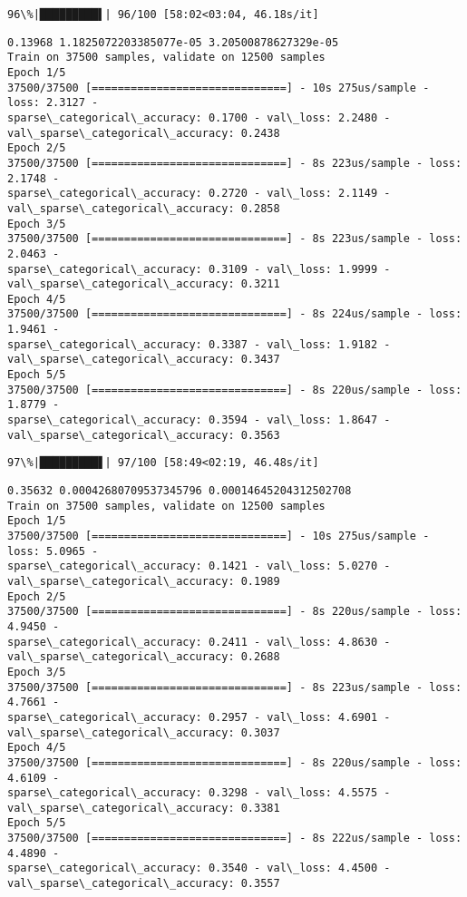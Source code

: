 \documentclass[11pt]{article}
\begin{document}
    \begin{Verbatim}[commandchars=\\\{\}]
 96\%|█████████▌| 96/100 [58:02<03:04, 46.18s/it]
    \end{Verbatim}

    \begin{Verbatim}[commandchars=\\\{\}]
0.13968 1.1825072203385077e-05 3.20500878627329e-05
Train on 37500 samples, validate on 12500 samples
Epoch 1/5
37500/37500 [==============================] - 10s 275us/sample - loss: 2.3127 -
sparse\_categorical\_accuracy: 0.1700 - val\_loss: 2.2480 -
val\_sparse\_categorical\_accuracy: 0.2438
Epoch 2/5
37500/37500 [==============================] - 8s 223us/sample - loss: 2.1748 -
sparse\_categorical\_accuracy: 0.2720 - val\_loss: 2.1149 -
val\_sparse\_categorical\_accuracy: 0.2858
Epoch 3/5
37500/37500 [==============================] - 8s 223us/sample - loss: 2.0463 -
sparse\_categorical\_accuracy: 0.3109 - val\_loss: 1.9999 -
val\_sparse\_categorical\_accuracy: 0.3211
Epoch 4/5
37500/37500 [==============================] - 8s 224us/sample - loss: 1.9461 -
sparse\_categorical\_accuracy: 0.3387 - val\_loss: 1.9182 -
val\_sparse\_categorical\_accuracy: 0.3437
Epoch 5/5
37500/37500 [==============================] - 8s 220us/sample - loss: 1.8779 -
sparse\_categorical\_accuracy: 0.3594 - val\_loss: 1.8647 -
val\_sparse\_categorical\_accuracy: 0.3563
    \end{Verbatim}

    \begin{Verbatim}[commandchars=\\\{\}]
 97\%|█████████▋| 97/100 [58:49<02:19, 46.48s/it]
    \end{Verbatim}

    \begin{Verbatim}[commandchars=\\\{\}]
0.35632 0.00042680709537345796 0.00014645204312502708
Train on 37500 samples, validate on 12500 samples
Epoch 1/5
37500/37500 [==============================] - 10s 275us/sample - loss: 5.0965 -
sparse\_categorical\_accuracy: 0.1421 - val\_loss: 5.0270 -
val\_sparse\_categorical\_accuracy: 0.1989
Epoch 2/5
37500/37500 [==============================] - 8s 220us/sample - loss: 4.9450 -
sparse\_categorical\_accuracy: 0.2411 - val\_loss: 4.8630 -
val\_sparse\_categorical\_accuracy: 0.2688
Epoch 3/5
37500/37500 [==============================] - 8s 223us/sample - loss: 4.7661 -
sparse\_categorical\_accuracy: 0.2957 - val\_loss: 4.6901 -
val\_sparse\_categorical\_accuracy: 0.3037
Epoch 4/5
37500/37500 [==============================] - 8s 220us/sample - loss: 4.6109 -
sparse\_categorical\_accuracy: 0.3298 - val\_loss: 4.5575 -
val\_sparse\_categorical\_accuracy: 0.3381
Epoch 5/5
37500/37500 [==============================] - 8s 222us/sample - loss: 4.4890 -
sparse\_categorical\_accuracy: 0.3540 - val\_loss: 4.4500 -
val\_sparse\_categorical\_accuracy: 0.3557
    \end{Verbatim}
\end{document}
